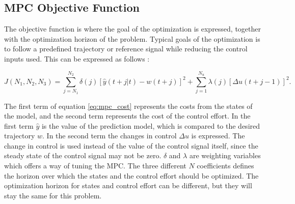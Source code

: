 \subsection{MPC Objective Function}

The objective function is where the goal of the optimization is expressed, together with the optimization horizon of the problem. Typical goals of the optimization is to follow a predefined trajectory or reference signal while reducing the control inputs used. This can be expressed as follows \cite{mpcCAMACHO}:

\begin{equation}
	\label{eq:mpc_cost}
	J(N_1, N_2, N_3) = \sum_{j=N_1}^{N_2} \delta(j)[\hat{y}(t+j|t)-w(t+j)]^2 + 
	\sum_{j=1}^{N_u}\lambda(j)[\Delta u(t+j-1)]^2.
\end{equation}

The first term of equation \ref{eq:mpc_cost} represents the costs from the states of the model, and the second term represents the cost of the control effort. In the first term $\hat{y}$ is the value of the prediction model, which is compared to the desired trajectory $w$. In the second term the changes in control $\Delta u$ is expressed. The change in control is used instead of the value of the control signal itself, since the steady state of the control signal may not be zero. $\delta$ and $\lambda$ are weighting variables which offers a way of tuning the MPC. The three different $N$ coefficients defines the horizon over which the states and the control effort should be optimized. The optimization horizon for states and control effort can be different, but they will stay the same for this problem.